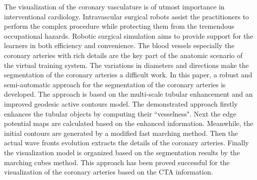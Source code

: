 
The visualization of the coronary vasculature is of utmost importance in interventional cardiology.
Intravascular surgical robots assist the practitioners to perform the complex procedure while protecting them from the tremendous occupational hazards.
Robotic surgical simulation aims to provide support for the learners in both efficiency and convenience.
The blood vessels especially the coronary arteries with rich details are the key part of the anatomic scenario of the virtual training system.
The variations in diameters and directions make the segmentation of the coronary arteries a difficult work.
In this paper, a robust and semi-automatic approach for the segmentation of the coronary arteries is developed.
The approach is based on the multi-scale tubular enhancement and an improved geodesic active contours model.
The demonstrated approach firstly enhances the tubular objects by computing their ``vesselness".
Next the edge potential maps are calculated based on the enhanced information.
Meanwhile, the initial contours are generated by a modified fast marching method.
Then the actual wave fronts evolution extracts the details of the coronary arteries.
Finally the visualization model is organized based on the segmentation results by the marching cubes method.
This approach has been proved successful for the visualization of the coronary arteries based on the CTA information.